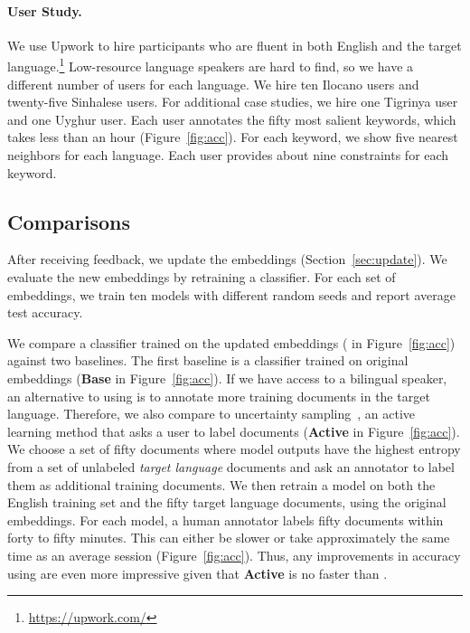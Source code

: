 \paragraph{User Study.}
We use Upwork to hire participants who are fluent in both English and the
target language.\footnote{\url{https://upwork.com/}}
Low-resource language speakers are hard to find, so we have a different number of
users for each language.
We hire ten Ilocano users and twenty-five
Sinhalese users.
For additional case studies, we hire one Tigrinya user and one Uyghur user.
Each user annotates the fifty most salient keywords, which takes less than an hour (Figure~\ref{fig:acc}).
For each keyword, we show five nearest neighbors for each language.
Each user provides about nine constraints for each keyword.

\subsection{Comparisons}
\label{ssec:methods}

After receiving feedback, we update the embeddings (Section~\ref{sec:update}).
We evaluate the new embeddings by retraining a classifier.
For each set of embeddings, we train ten models with different random seeds and
report average test accuracy.

We compare a classifier trained on the updated embeddings
(\textbf{\name{}} in Figure~\ref{fig:acc}) against two baselines.
The first baseline is a classifier trained on original embeddings
(\textbf{Base} in Figure~\ref{fig:acc}).
If we have access to a bilingual speaker, an alternative to using \name{} is to
annotate more training documents in the target language.
Therefore, we also compare \name{} to uncertainty
sampling~\citep{lewis-1994}, an active learning method that asks a user to
label documents (\textbf{Active} in Figure~\ref{fig:acc}).
We choose a set of fifty documents where model outputs have the
highest entropy from a set of unlabeled \emph{target language} documents
and ask an annotator to label them as additional training documents.
We then retrain a model on both the English training set and the fifty target
language documents, using the original embeddings.
For each model, a human annotator labels fifty
documents within forty to fifty minutes.
This can either be slower or take approximately the same time as an average
\name{} session (Figure~\ref{fig:acc}).
Thus, any improvements in accuracy using \name{} are even more impressive
given that \textbf{Active} is no faster than \name{}.

